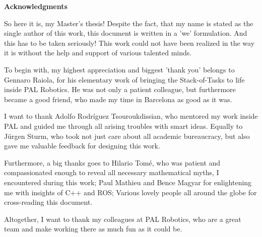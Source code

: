 \clearemptydoublepage
{}
{}	



\vspace*{2cm}

\begin{center}
{\Large \bf Acknowledgments}
\end{center}

So here it is, my Master's thesis! Despite the fact, that my name is stated as the single author of this work, this document is written in a 'we' formulation. And this has to be taken seriously! This work could not have been realized in the way it is without the help and support of various talented minds.

To begin with, my highest appreciation and biggest 'thank you' belongs to Gennaro Raiola, for his elementary work of bringing the Stack-of-Tasks to life inside PAL Robotics. He was not only a patient colleague, but furthermore became a good friend, who made my time in Barcelona as good as it was.

I want to thank Adolfo Rodr{\'i}guez Tsouroukdissian, who mentored my work inside PAL and guided me through all arising troubles with smart ideas. Equally to J{\"u}rgen Sturm, who took not just care about all academic bureaucracy, but also gave me valuable feedback for designing this work. 

Furthermore, a big thanks goes to Hilario Tom{\'e}, who was patient and compassionated enough to reveal all necessary mathematical myths, I encountered during this work; Paul Mathieu and Bence Magyar for enlightening me with insights of C++ and ROS; Various lovely people all around the globe for cross-reading this document.

Altogether, I want to thank my colleagues at PAL Robotics, who are a great team and make working there as much fun as it could be. 

\vspace{1cm}
